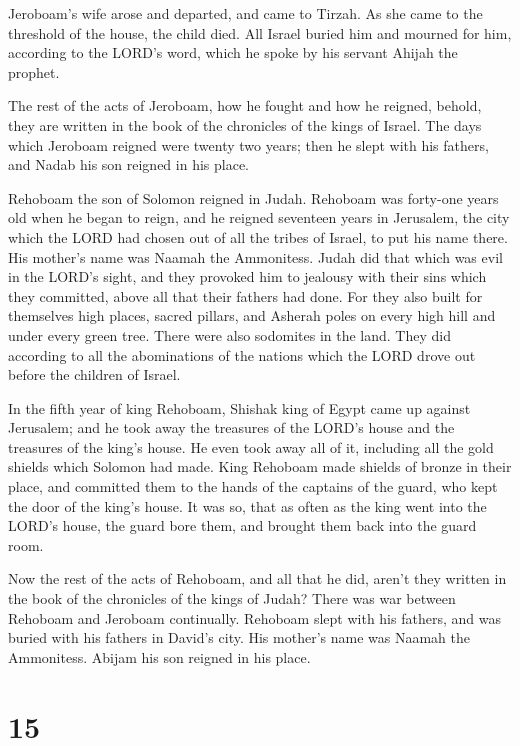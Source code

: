  Jeroboam's wife arose and departed, and came to Tirzah. As
she came to the threshold of the house, the child died. 
All Israel buried him and mourned for him, according to the LORD's word,
which he spoke by his servant Ahijah the prophet.

 The rest of the acts of Jeroboam, how he fought and how he
reigned, behold, they are written in the book of the chronicles of the
kings of Israel.  The days which Jeroboam reigned were
twenty two years; then he slept with his fathers, and Nadab his son
reigned in his place.

 Rehoboam the son of Solomon reigned in Judah. Rehoboam was
forty-one years old when he began to reign, and he reigned seventeen
years in Jerusalem, the city which the LORD had chosen out of all the
tribes of Israel, to put his name there. His mother's name was Naamah
the Ammonitess.  Judah did that which was evil in the
LORD's sight, and they provoked him to jealousy with their sins which
they committed, above all that their fathers had done.  For
they also built for themselves high places, sacred pillars, and Asherah
poles on every high hill and under every green tree.  There
were also sodomites in the land. They did according to all the
abominations of the nations which the LORD drove out before the children
of Israel.

 In the fifth year of king Rehoboam, Shishak king of Egypt
came up against Jerusalem;  and he took away the treasures
of the LORD's house and the treasures of the king's house. He even took
away all of it, including all the gold shields which Solomon had made.
 King Rehoboam made shields of bronze in their place, and
committed them to the hands of the captains of the guard, who kept the
door of the king's house.  It was so, that as often as the
king went into the LORD's house, the guard bore them, and brought them
back into the guard room.

 Now the rest of the acts of Rehoboam, and all that he did,
aren't they written in the book of the chronicles of the kings of Judah?
 There was war between Rehoboam and Jeroboam continually.
 Rehoboam slept with his fathers, and was buried with his
fathers in David's city. His mother's name was Naamah the Ammonitess.
Abijam his son reigned in his place.

\hypertarget{section-14}{%
\section{15}\label{section-14}}

